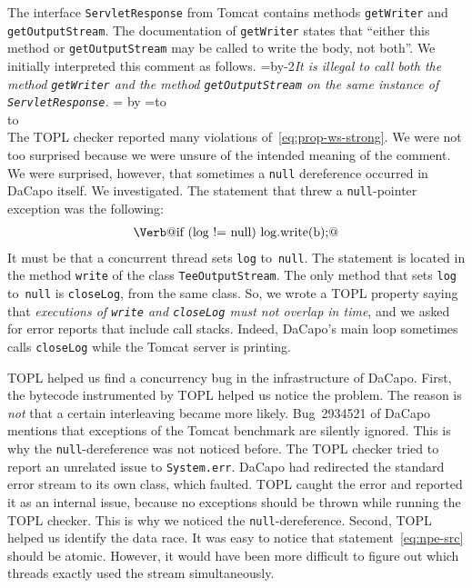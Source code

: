 \documentclass[9pt, preprint]{sigplanconf} %
\newcommand{\noterg}[2]{\textcolor{gray}{[\textcolor{red}{#1}: #2]}}
\newcommand{\rg}[1]{\noterg{rg}{#1}}
\newcommand{\quoteindent}{1.5\parindent} %
\newcommand{\eqquote}[2]{{%
  \refstepcounter{equation}\label{#2}%
  \newdimen\qi\qi=\quoteindent
  \setbox0=\vbox{\advance\hsize by-2\qi\noindent\em#1}%
  \newdimen\x\x=\ht0 \advance\x by\dp0%
  \setbox1=\vbox to\x{\vss\hbox{(\arabic{equation})}\vss}%
  \leavevmode\\[1ex]%
  \hbox to\hsize{\hskip\qi\box0\hfil\box1}%
  \\[1ex]}}
\theoremstyle{definition}
\theoremstyle{remark}
\begin{document}
The interface \texttt{ServletResponse} from Tomcat contains methods \texttt{getWriter} and \texttt{getOutputStream}.
The documentation of \texttt{getWriter} states that ``either this method or \texttt{getOutputStream} may be called to write the body, not both''.
We initially interpreted this comment as follows.
\eqquote{It is illegal to call both the method {\tt getWriter} and the method {\tt getOutputStream} on the same instance of {\tt ServletResponse}.}{eq:prop-ws-strong}
The TOPL checker reported many violations of~\eqref{eq:prop-ws-strong}.
We were not too surprised because we were unsure of the intended meaning of the comment.
We were surprised, however, that sometimes a {\tt null} dereference occurred in DaCapo itself.
We investigated.
The statement that threw a {\tt null}-pointer exception was the following:
\begin{align}\label{eq:npe-src}
\text{\Verb@if (log != null) log.write(b);@}
\end{align}
It must be that a concurrent thread sets {\tt log} to~{\tt null}.
The statement is located in the method {\tt write} of the class {\tt TeeOutputStream}.
The only method that sets {\tt log} to~{\tt null} is {\tt closeLog}, from the same class.
So, we wrote a TOPL property saying that \textit{executions of {\tt write} and {\tt closeLog} must not overlap in time}, and we asked for error reports that include call stacks.
Indeed, DaCapo's main loop sometimes calls {\tt closeLog} while the Tomcat server is printing.

TOPL helped us find a concurrency bug in the infrastructure of DaCapo.
First, the bytecode instrumented by TOPL helped us notice the problem.
The reason is \emph{not} that a certain interleaving became more likely.
Bug~2934521 of DaCapo mentions that exceptions of the Tomcat benchmark are silently ignored.
This is why the {\tt null}-dereference was not noticed before.
The TOPL checker tried to report an unrelated issue to {\tt System.err}.
DaCapo had redirected the standard error stream to its own class, which faulted.
TOPL caught the error and reported it as an internal issue, because no exceptions should be thrown while running the TOPL checker.
This is why we noticed the {\tt null}-dereference.
Second, TOPL helped us identify the data race.
It was easy to notice that statement~\eqref{eq:npe-src} should be atomic.
However, it would have been more difficult to figure out which threads exactly used the stream simultaneously.
\end{document}
